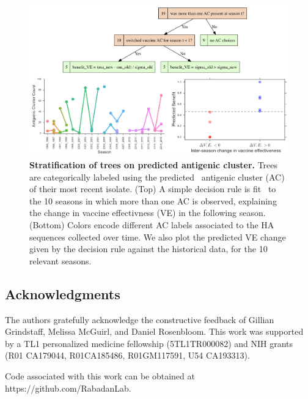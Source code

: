 \documentclass[a4paper,11pt]{article}
\begin{document}
\begin{figure}
    \centering
    \includegraphics[width=\linewidth]{../figures/influenza_antigenic.png}
    \caption{{\bf Stratification of trees on predicted antigenic cluster.} Trees are categorically labeled using the predicted~\cite{du2012mapping} antigenic cluster (AC) of their most recent isolate. (Top) A simple decision rule is fit~\cite{schmidt2009distilling} to the 10 seasons in which more than one AC is observed, explaining the change in vaccine effectivness (VE) in the following season. (Bottom) Colors encode different AC labels associated to the HA sequences collected over time. We also plot the predicted VE change given by the decision rule against the historical data, for the 10 relevant seasons.}
    \label{fig:flu_antigenic}
\end{figure}


\subsection*{Acknowledgments}

The authors gratefully acknowledge the constructive feedback of Gillian Grindstaff, Melissa McGuirl, and Daniel Rosenbloom.
This work was supported by a TL1 personalized medicine fellowship (5TL1TR000082) and NIH grants (R01 CA179044, R01CA185486, R01GM117591, U54 CA193313).

\vspace{0.25in}

Code associated with this work can be obtained at https://github.com/RabadanLab.




\end{document}
